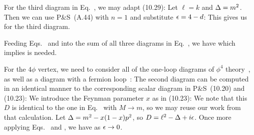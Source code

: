 \documentclass[11pt]{article}
\begin{document}
{	For the third diagram in Eq.~, we may adapt (10.29):
	Let $\ell = k$ and $\Delta = m^2$.  Then we can use P\&S~(A.44) with $n = 1$ and substitute $\epsilon = 4 - d$:
	This gives us
	for the third diagram.
	
	Feeding Eqs.~ and  into the sum of all three diagrams in Eq.~, we have
	which implies
	is needed.
	
	
	
	For the $4\phi$ vertex, we need to consider all of the one-loop diagrams of $\phi^4$ theory~\cite[p.~326]{Peskin}, as well as a diagram with a fermion loop~\cite[p.~121]{Peskin}:
	The second diagram can be computed in an identical manner to the corresponding scalar diagram in P\&S~(10.20) and (10.23):
	We introduce the Feynman parameter $x$ as in (10.23):
	We note that this $D$ is identical to the one in Eq.~ with $M \to m$, so we may reuse our work from that calculation.  Let $\Delta = m^2 - x (1 - x) p^2$, so $D = \ell^2 - \Delta + i \epsilon$.  Once more applying Eqs.~ and , we have
	as $\epsilon \to 0$.
	
}
\end{document}
